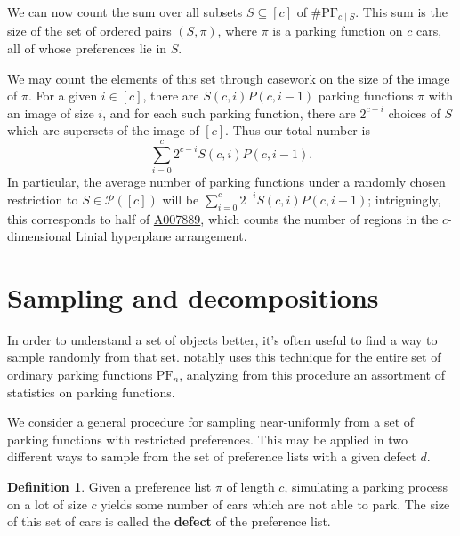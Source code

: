 \documentclass[12 pt]{amsart}
\theoremstyle{definition} %
\newtheorem{definition}[theorem]{Definition}
\theoremstyle{remark} %
\begin{document}
We can now count the sum over all subsets $S\subseteq [c]$ of $\#\mathrm{PF}_{c\mid S}$. This sum is the size of the set of ordered pairs $(S,\pi)$, where $\pi$ is a parking function on $c$ cars, all of whose preferences lie in $S$.

We may count the elements of this set through casework on the size of the image of $\pi$. For a given $i\in[c]$, there are $S(c,i)P(c,i-1)$ parking functions $\pi$ with an image of size $i$, and for each such parking function, there are $2^{c-i}$ choices of $S$ which are supersets of the image of $[c]$. Thus our total number is
\[
    \sum_{i=0}^{c} 2^{c-i}S(c,i)P(c,i-1).
\]
In particular, the average number of parking functions under a randomly chosen restriction to $S\in\mathcal{P}([c])$ will be $\sum_{i=0}^{c} 2^{-i}S(c,i)P(c,i-1)$; intriguingly, this corresponds to half of \href{https://oeis.org/A007889}{A007889}, which counts the number of regions in the $c$-dimensional Linial hyperplane arrangement.

\section{Sampling and decompositions} \label{s:sample}


In order to understand a set of objects better, it's often useful to find a way to sample randomly from that set. \cite{diaconis-hicks-2017} notably uses this technique for the entire set of ordinary parking functions $\mathrm{PF}_n$, analyzing from this procedure an assortment of statistics on parking functions.

We consider a general procedure for sampling near-uniformly from a set of parking functions with restricted preferences. This may be applied in two different ways to sample from the set of preference lists with a given defect $d$.

\begin{definition}
    Given a preference list $\pi$ of length $c$, simulating a parking process on a lot of size $c$ yields some number of cars which are not able to park. The size of this set of cars is called the \textbf{defect} of the preference list.
\end{definition}


\end{document}
